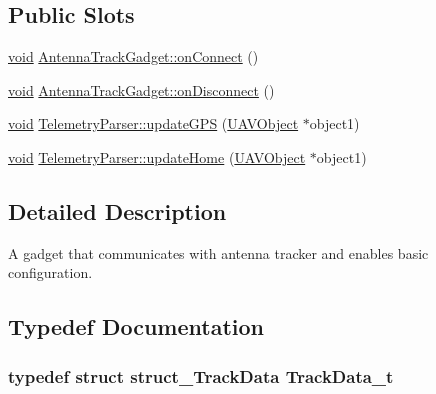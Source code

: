 \subsection*{Public Slots}
\begin{DoxyCompactItemize}
\item 
\hyperlink{group___u_a_v_objects_plugin_ga444cf2ff3f0ecbe028adce838d373f5c}{void} \hyperlink{group___antenna_track_gadget_plugin_ga900506724dae73384f80ed883f037588}{Antenna\-Track\-Gadget\-::on\-Connect} ()
\item 
\hyperlink{group___u_a_v_objects_plugin_ga444cf2ff3f0ecbe028adce838d373f5c}{void} \hyperlink{group___antenna_track_gadget_plugin_ga2732f0141e7e02dc548535a3a87965a6}{Antenna\-Track\-Gadget\-::on\-Disconnect} ()
\item 
\hyperlink{group___u_a_v_objects_plugin_ga444cf2ff3f0ecbe028adce838d373f5c}{void} \hyperlink{group___antenna_track_gadget_plugin_ga9b1c1509701c154ad1c3cdeef0cb522b}{Telemetry\-Parser\-::update\-G\-P\-S} (\hyperlink{class_u_a_v_object}{U\-A\-V\-Object} $\ast$object1)
\item 
\hyperlink{group___u_a_v_objects_plugin_ga444cf2ff3f0ecbe028adce838d373f5c}{void} \hyperlink{group___antenna_track_gadget_plugin_ga0e7bcbaf20beede5d60913dc50505465}{Telemetry\-Parser\-::update\-Home} (\hyperlink{class_u_a_v_object}{U\-A\-V\-Object} $\ast$object1)
\end{DoxyCompactItemize}


\subsection{Detailed Description}
A gadget that communicates with antenna tracker and enables basic configuration. 

\subsection{Typedef Documentation}
\hypertarget{group___antenna_track_gadget_plugin_ga2a189738d52fd5df21e4a823d19ad1ac}{
\subsubsection[{Track\-Data\-\_\-t}]{\setlength{\rightskip}{0pt plus 5cm}typedef {\bf struct} {\bf struct\-\_\-\-Track\-Data} {\bf Track\-Data\-\_\-t}}}\label{group___antenna_track_gadget_plugin_ga2a189738d52fd5df21e4a823d19ad1ac}


